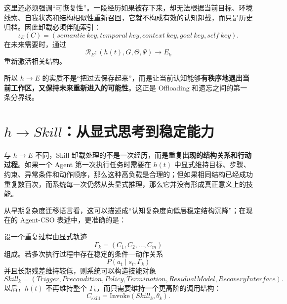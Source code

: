 这里还必须强调“可恢复性”。一段经历如果被存下来，却无法根据当前目标、环境线索、自我状态和结构相似性重新召回，它就不构成有效的认知卸载，而只是历史归档。因此卸载必须伴随索引：
\begin{equation}
\iota_E(C)
=
(
semantic\ key,
temporal\ key,
context\ key,
goal\ key,
self\ key
).
\end{equation}
在未来需要时，通过
\begin{equation}
\mathcal R_E:
(h(t),G,\Theta,\Psi)
\rightarrow
E_k
\end{equation}
重新激活相关结构。

所以 $h\rightarrow E$ 的实质不是“把过去保存起来”，而是让当前认知能够\textbf{有秩序地退出当前工作区，又保持未来重新进入的可能性}。这正是 Offloading 和遗忘之间的第一条分界线。

\section{$h\rightarrow Skill$：从显式思考到稳定能力}

与 $h\rightarrow E$ 不同，Skill 卸载处理的不是一次经历，而是\textbf{重复出现的结构关系和行动过程}。如果一个 Agent 第一次执行任务时需要在 $h(t)$ 中显式维持目标、步骤、约束、异常条件和动作顺序，那么这种高负载是合理的；但如果相同结构已经成功重复数百次，而系统每一次仍然从头显式推理，那么它并没有形成真正意义上的技能。

从早期复杂度迁移语言看，这可以描述成“认知复杂度向低层稳定结构沉降”；在现在的 Agent-CSO 表述中，更准确的是：
\begin{statementbox}
\centering
{}
\end{statementbox}

设一个重复过程由显式轨迹
\begin{equation}
\Gamma_k
=
(C_1,C_2,\ldots,C_m)
\end{equation}
组成。若多次执行过程中存在稳定的条件—动作关系
\begin{equation}
P(a_t\mid s_t,\Gamma_k)
\end{equation}
并且长期残差维持较低，则系统可以构造技能对象
\begin{equation}
Skill_k
=
(
Trigger,
Precondition,
Policy,
Termination,
ResidualModel,
RecoveryInterface
).
\end{equation}
以后，$h(t)$ 不再维持整个 $\Gamma_k$，而只需要维持一个更高阶的调用结构：
\begin{equation}
C_{\mathrm{skill}}
=
\mathrm{Invoke}(Skill_k,\theta_k).
\end{equation}

